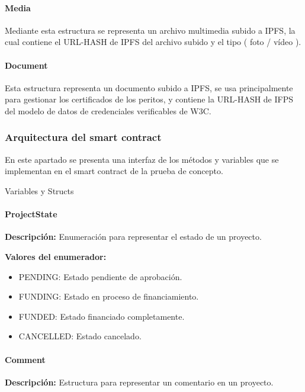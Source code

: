 \paragraph{Media}

Mediante esta estructura se representa un archivo multimedia subido a IPFS, la cual contiene el URL-HASH de IPFS del archivo subido y  el tipo ( foto / vídeo ).

\paragraph{Document}

Esta estructura representa un documento subido a IPFS, se usa principalmente para gestionar los certificados de los peritos, y contiene la URL-HASH de IFPS del modelo de datos de credenciales verificables de W3C\cite{w3c}.

\newpage

\subsubsection{Arquitectura del smart contract}

En este apartado se presenta una interfaz de los métodos y variables que se implementan en el smart contract de la prueba de concepto.

\bigskip

{\huge Variables y Structs}

\paragraph{ProjectState}
\textbf{Descripción:}
Enumeración para representar el estado de un proyecto.

\textbf{Valores del enumerador:}
\begin{itemize}
    \item PENDING: Estado pendiente de aprobación.
    \item FUNDING: Estado en proceso de financiamiento.
    \item FUNDED: Estado financiado completamente.
    \item CANCELLED: Estado cancelado.
\end{itemize}


\paragraph{Comment}
\textbf{Descripción:}
Estructura para representar un comentario en un proyecto.

